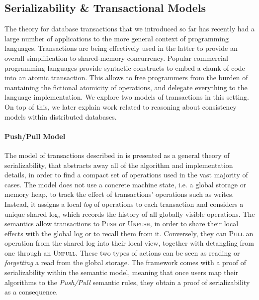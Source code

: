 \tocless\subsection{Serializability \& Transactional Models}

\label{sec:serTransMod}

The theory for database transactions that we introduced so far has recently had a large number of applications to the more general context of programming languages. Transactions are being effectively used in the latter to provide an overall simplification to shared-memory concurrency. Popular commercial programming languages provide syntactic constructs to embed a chunk of code into an atomic transaction. This allows to free programmers from the burden of mantaining the fictional atomicity of operations, and delegate everything to the language implementation. We explore two models of transactions in this setting. On top of this, we later explain work related to reasoning about consistency models within distributed databases. \\

\paragraph{Push/Pull Model}
The model of transactions described in \cite{pushPull} is presented as a general theory of serializability, that abstracts away all of the algorithm and implementation details, in order to find a compact set of operations used in the vast majority of cases. The model does not use a concrete machine state, i.e. a global storage or memory heap, to track the effect of transactions' operations such as writes. Instead, it assigns a local \textit{log} of operations to each transaction and considers a unique shared log, which records the history of all globally visible operations. The semantics allow transactions to \textsc{Push} or \textsc{Unpush}, in order to share their local effects with the global log or to recall them from it. Conversely, they can \textsc{Pull} an operation from the shared log into their local view, together with detangling from one through an \textsc{Unpull}. These two types of actions can be seen as reading or \textit{forgetting} a read from the global storage. The framework comes with a proof of serializability within the semantic model, meaning that once users map their algorithms to the \textit{Push/Pull} semantic rules, they obtain a proof of serializability as a consequence.

